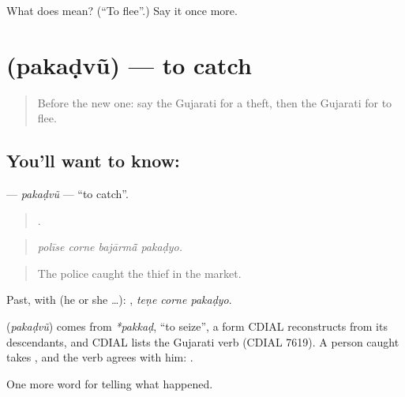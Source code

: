 \begin{tcolorbox}[breakable,colback=teal!4,colframe=teal!35!black,title={Before you move on}]
What does  mean? (\textquotedblleft{}To flee\textquotedblright{}.) Say it once more.
\end{tcolorbox}
\section[\texorpdfstring{\gu{પકડવું} (pakaḍvũ)}{પકડવું (pakaḍvũ)}]{ (pakaḍvũ) — to catch}

\label{lesson:GU-C285-pakadvu}



\begin{quote}
Before the new one: say the Gujarati for a theft, then the Gujarati for to flee.
\end{quote}

\subsection*{You'll want to know: }
\textbf{} — \emph{pakaḍvũ} — \textquotedblleft{}to catch\textquotedblright{}.

\begin{quote}
   .
\end{quote}

\begin{quote}
\emph{polīse corne bajārmā̃ pakaḍyo.}
\end{quote}

\begin{quote}
The police caught the thief in the market.
\end{quote}

Past, with  (he or she …):   , \emph{teṇe corne pakaḍyo}.

\begin{cousinweb}
\textbf{} (\emph{pakaḍvũ}) comes from \emph{*pakkaḍ}, \textquotedblleft{}to seize\textquotedblright{}, a form CDIAL reconstructs from its descendants, and CDIAL lists the Gujarati verb (CDIAL 7619). A person caught takes \textbf{}, and the verb agrees with him: \textbf{ }.
\end{cousinweb}

\begin{grammarlens}[title={What you've built}]
One more word for telling what happened.
\end{grammarlens}

